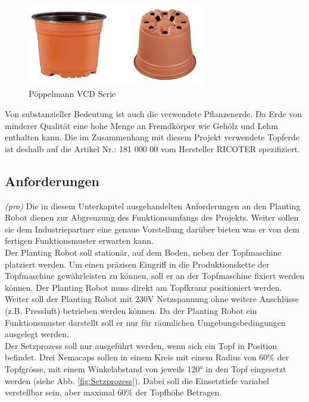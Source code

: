 \begin{figure}[H]
	\includegraphics[width=0.7\textwidth]{Illustrationen/4-Entwurf/VCD_Serie.png}
	\caption{Pöppelmann VCD Serie}
	\label{fig:toepfe}
\end{figure}

Von substanzieller Bedeutung ist auch die verwendete Pflanzenerde. Da Erde von minderer Qualität eine hohe Menge an Fremdkörper wie Gehölz und Lehm enthalten kann. Die im Zusammenhang mit diesem Projekt verwendete Topferde ist deshalb auf die Artikel Nr.: 181 000 00 vom Hersteller RICOTER spezifiziert.

\subsection{Anforderungen}
\textit{(pro)} Die in diesem Unterkapitel ausgehandelten Anforderungen an den Planting Robot dienen zur Abgrenzung des Funktionsumfangs des Projekts. Weiter sollen sie dem Industriepartner eine genaue Vorstellung darüber bieten was er von dem fertigen Funktionsmuster erwarten kann.\\
\newline
Der Planting Robot soll stationär, auf dem Boden, neben der Topfmaschine platziert werden. Um einen präzisen Eingriff in die Produktionskette der Topfmaschine gewährleisten zu können, soll er an der Topfmaschine fixiert werden können. Der Planting Robot muss direkt am Topfkranz positioniert werden. Weiter soll der Planting Robot mit 230V Netzspannung ohne weitere Anschlüsse (z.B. Pressluft) betrieben werden können. Da der Planting Robot ein Funktionsmuster darstellt soll er nur für räumlichen Umgebungsbedingungen ausgelegt werden. \\
\newline
Der Setzprozess soll nur ausgeführt werden, wenn sich ein Topf in Position befindet. Drei Nemacaps sollen in einem Kreis mit einem Radius von 60$\%$ der Topfgrösse, mit einem Winkelabstand von jeweils 120° in den Topf eingesetzt werden (siehe Abb. \ref{fig:Setzprozess}). Dabei soll die Einsetztiefe variabel verstellbar sein, aber maximal 60$\%$ der Topfhöhe Betragen. 

